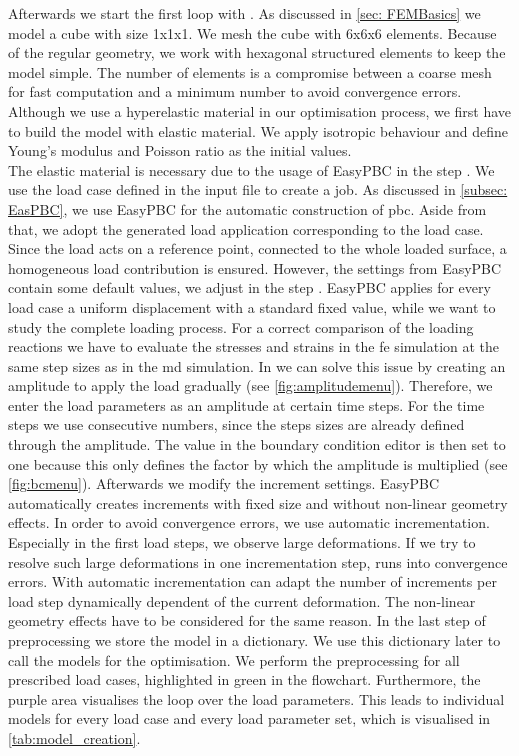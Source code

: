 Afterwards we start the first loop with . As discussed in \autoref{sec: FEMBasics} we model a cube with size 1x1x1. We mesh the cube with 6x6x6 elements. Because of the regular geometry, we work with hexagonal structured elements to keep the model simple. The number of elements is a compromise between a coarse mesh for fast computation and a minimum number to avoid convergence errors. Although we use a hyperelastic material in our optimisation process, we first have to build the model with elastic material. We apply isotropic behaviour and define Young's modulus and Poisson ratio as the initial values. \\
\indent The elastic material is necessary due to the usage of EasyPBC in the step . We use the load case defined in the input file to create a job. As discussed in \autoref{subsec: EasPBC}, we use EasyPBC for the automatic construction of \acrshort{pbc}. Aside from that, we adopt the generated load application corresponding to the load case. Since the load acts on a reference point, connected to the whole loaded surface, a homogeneous load contribution is ensured.
However, the settings from EasyPBC contain some default values, we adjust in the step . EasyPBC applies for every load case a uniform displacement with a standard fixed value, while we want to study the complete loading process. For a correct comparison of the loading reactions we have to evaluate the stresses and strains in the \acrshort{fe} simulation at the same step sizes as in the \acrshort{md} simulation. In  we can solve this issue by creating an amplitude to apply the load gradually (see \autoref{fig:amplitudemenu}). Therefore, we enter the load parameters as an amplitude at certain time steps. For the time steps we use consecutive numbers, since the steps sizes are already defined through the amplitude. The value in the boundary condition editor is then set to one because this only defines the factor by which the amplitude is multiplied (see \autoref{fig:bcmenu}). Afterwards we modify the increment settings. EasyPBC automatically creates increments with fixed size and without non-linear geometry effects. In order to avoid convergence errors, we use automatic incrementation. Especially in the first load steps, we observe large deformations. If we try to resolve such large deformations in one incrementation step,  runs into convergence errors. With automatic incrementation  can adapt the number of increments per load step dynamically dependent of the current deformation. The non-linear geometry effects have to be considered for the same reason. In the last step of preprocessing we store the model in a dictionary. We use this dictionary later to call the models for the optimisation. We perform the preprocessing for all prescribed load cases, highlighted in green in the flowchart. Furthermore, the purple area visualises the loop over the load parameters. This leads to individual models for every load case and every load parameter set, which is visualised in \autoref{tab:model_creation}.

